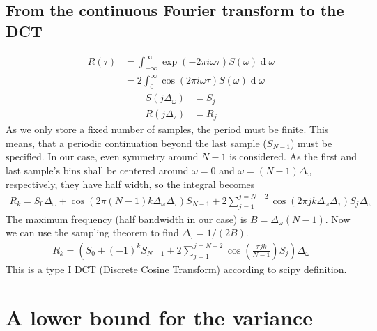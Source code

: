 \documentclass[18pt,a4paper]{extarticle}
\renewcommand{\d}[1]{\ensuremath{\operatorname{d}\!{#1}}}
\begin{document}
\subsection{From the continuous Fourier transform to the DCT}
\begin{align}
R(\tau) &= \int_{-\infty}^{\infty} \exp(-2\pi i\omega\tau) S(\omega) \d \omega \\
&=2\int_{0}^{\infty} \cos(2\pi i\omega\tau) S(\omega) \d \omega
\end{align}
\begin{align}
S(j\Delta_\omega) &= S_j\\
R(j\Delta_\tau) &= R_j
\end{align}
As we only store a fixed number of samples, the period must be finite.
This means, that a periodic continuation beyond the last sample ($S_{N-1}$) must be specified.
In our case, even symmetry around $N-1$ is considered.
As the first and last sample's bins shall be centered around $\omega=0$ and $\omega=(N-1)\Delta_\omega$ respectively, they have half width, so the integral becomes
\begin{align}
R_k = S_0\Delta_\omega + \cos({2\pi (N-1) k\Delta_\omega \Delta_\tau}) S_{N-1} + 2\sum_{j=1}^{j=N-2}\cos({2\pi j k \Delta_\omega \Delta_\tau}) S_j \Delta_\omega 
\end{align}
The maximum frequency (half bandwidth in our case) is $B = \Delta_\omega (N - 1)$.
Now we can use the sampling theorem to find $\Delta_\tau = 1/(2B)$.
\begin{align}
R_k = \left(S_0 + (-1)^kS_{N-1} + 2\sum_{j=1}^{j=N-2}\cos \left(\frac{\pi j k}{N-1}  \right) S_j \right) \Delta_\omega
\end{align}
This is a type I DCT (Discrete Cosine Transform) according to scipy definition. 

\section{A lower bound for the variance}
\end{document}
